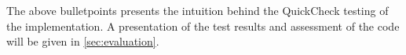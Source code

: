 The above bulletpoints presents the intuition behind the QuickCheck testing of the implementation. A presentation of the test results and assessment of the code will be given in \cref{sec:evaluation}.






















